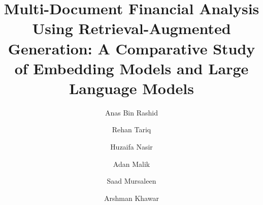 \documentclass[runningheads]{llncs}
\begin{document}
\title{Multi-Document Financial Analysis Using Retrieval-Augmented Generation: A Comparative Study of Embedding Models and Large Language Models}

\author{Anas Bin Rashid \and
Rehan Tariq \and
Huzaifa Nasir \and
Adan Malik \and
Saad Mursaleen \and
Arshman Khawar}



\maketitle
\end{document}
